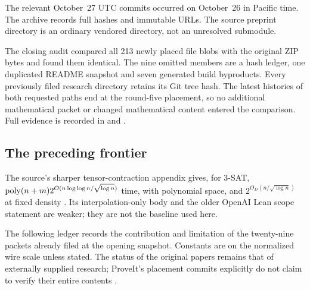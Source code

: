 The relevant October~27 UTC commits occurred on October~26 in Pacific time.
The archive records full hashes and immutable URLs. The source preprint
directory is an ordinary vendored directory, not an unresolved submodule.

The closing audit compared all 213 newly placed file blobs with the original
ZIP bytes and found them identical. The nine omitted members are a hash
ledger, one duplicated README snapshot and seven generated build byproducts.
Every previously filed research directory retains its Git tree hash.
The latest histories of both requested paths end at the round-five
placement, so no additional mathematical packet or changed mathematical
content entered the comparison. Full evidence is recorded in
 and .

\subsection{The preceding frontier}

The source's sharper tensor-contraction appendix gives, for 3-SAT,
$\operatorname{poly}(n+m)2^{O(n\log\log n/\sqrt{\log n})}$ time, with polynomial
space, and $2^{O_D(n/\sqrt{\log n})}$ at fixed density
\cite{source}. Its interpolation-only body and the older OpenAI Lean scope
statement are weaker; they are not the baseline used here.

The following ledger records the contribution and limitation of the
twenty-nine packets already filed at the opening snapshot. Constants are on the normalized wire scale unless stated.
The status of the original papers remains that of externally supplied
research; ProveIt's placement commits explicitly do not claim to verify
their entire contents \cite{index}.

